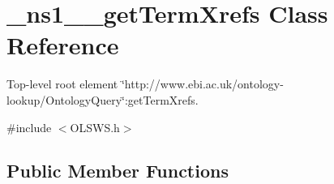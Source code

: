 \hypertarget{class__ns1____getTermXrefs}{
\section{\_\-ns1\_\-\_\-getTermXrefs Class Reference}
\label{class__ns1____getTermXrefs}
}


Top-\/level root element \char`\"{}http://www.ebi.ac.uk/ontology-\/lookup/OntologyQuery\char`\"{}:getTermXrefs.  




{\ttfamily \#include $<$OLSWS.h$>$}

\subsection*{Public Member Functions}
